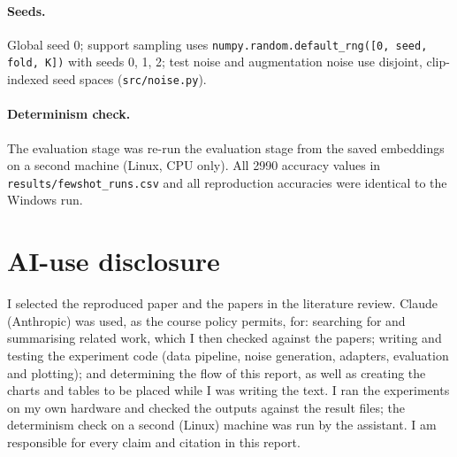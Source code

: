 \paragraph{Seeds.} Global seed 0; support sampling uses \texttt{numpy.random.default\_rng([0, seed, fold, K])} with seeds 0, 1, 2; test noise and augmentation noise use disjoint, clip-indexed seed spaces (\texttt{src/noise.py}).

\paragraph{Determinism check.} The evaluation stage was re-run the evaluation stage from the saved embeddings on a second machine (Linux, CPU only). All 2990 accuracy values in \texttt{results/fewshot\_runs.csv} and all reproduction accuracies were identical to the Windows run.

\section{AI-use disclosure}
I selected the reproduced paper and the papers in the literature review. Claude (Anthropic) was used, as the course policy permits, for: searching for and summarising related work, which I then checked against the papers; 
writing and testing the experiment code (data pipeline, noise generation, adapters, evaluation and plotting); and determining the flow of this report, as well as creating the charts and tables to be placed while I was writing the text. 
I ran the experiments on my own hardware and checked the outputs against the result files; the determinism check on a second (Linux) machine was run by the assistant. I am responsible for every claim and citation in this report.

